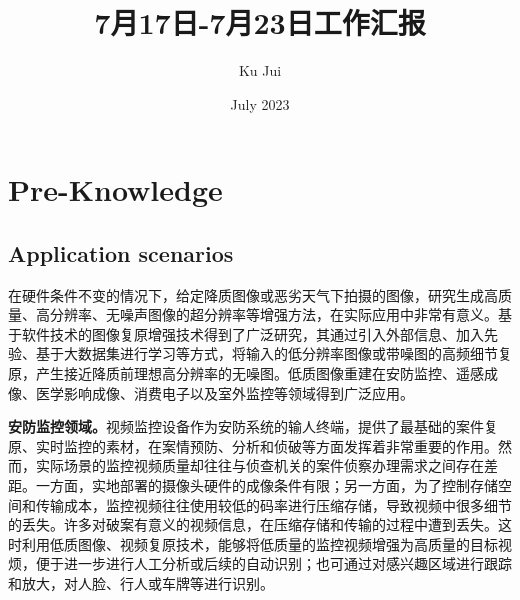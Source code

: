 \documentclass[letterpaper,10pt]{article}
\begin{document}
	
	
	\title{\songti {}7月17日-7月23日工作汇报}
	\author{\textrm{Ku Jui}}
	\date{\textrm{July 2023}}
	\maketitle
	
	\renewcommand{\figurename}{Figure} %
	\renewcommand{\contentsname}{Contents}
	\renewcommand{\tablename}{Table}
	\tableofcontents  %
	
	\section{Pre-Knowledge}
	
	\subsection{Application scenarios}
	
	在硬件条件不变的情况下，给定降质图像或恶劣天气下拍摄的图像，研究生成高质量、高分辨率、无噪声图像的超分辨率等增强方法，在实际应用中非常有意义。基于软件技术的图像复原增强技术得到了广泛研究，其通过引入外部信息、加入先验、基于大数据集进行学习等方式，将输入的低分辨率图像或带噪图的高频细节复原，产生接近降质前理想高分辨率的无噪图。低质图像重建在安防监控、遥感成像、医学影响成像、消费电子以及室外监控等领域得到广泛应用。
	
	\textbf{安防监控领域。}视频监控设备作为安防系统的输人终端，提供了最基础的案件复原、实时监控的素材，在案情预防、分析和侦破等方面发挥着非常重要的作用。然而，实际场景的监控视频质量却往往与侦查机关的案件侦察办理需求之间存在差距。一方面，实地部署的摄像头硬件的成像条件有限；另一方面，为了控制存储空间和传输成本，监控视频往往使用较低的码率进行压缩存储，导致视频中很多细节的丢失。许多对破案有意义的视频信息，在压缩存储和传输的过程中遭到丢失。这时利用低质图像、视频复原技术，能够将低质量的监控视频增强为高质量的目标视烦，便于进一步进行人工分析或后续的自动识别；也可通过对感兴趣区域进行跟踪和放大，对人脸、行人或车牌等进行识别。
	
\end{document}
